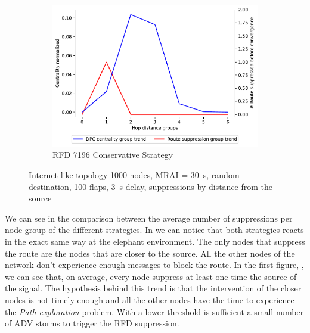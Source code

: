 \begin{figure}[h]
     \hfill
     \begin{subfigure}[b]{0.325\textwidth}
         \centering
         \includegraphics[width=\textwidth]{images/RFD/miceVSelephants/elephants/cisco_1000_RFD_7196_conservative_nodeConvergence_centVSsup_trend.pdf}
         \caption{RFD 7196 Conservative Strategy}
         \label{fig:1000_7196RFDC_cent_VS_sup_elephants}
     \end{subfigure}
		\caption{Internet like topology \num{1000} nodes, \ac{MRAI} = \SI{30}{\second},
		random destination, \num{100} flaps, \SI{3}{\second} delay, suppressions
		by distance from the source}
        \label{fig:1000_RFD_cent_VS_sup_elephants}
\end{figure}

We can see in  the comparison between
the average number of suppressions per node group of the different strategies.
In 
we can notice that both strategies reacts in the exact same way at the elephant
environment.
The only nodes that suppress the route are the nodes that are closer to the source.
All the other nodes of the network don't experience enough messages to block
the route.
In the first figure, , we can see
that, on average, every node suppress at least one time the source of the
signal.
The hypothesis behind this trend is that the intervention of the closer nodes
is not timely enough and all the other nodes have the time to experience the
\textit{Path exploration} problem.
With a lower threshold is sufficient a small number of \ac{ADV} storms
to trigger the \ac{RFD} suppression.

